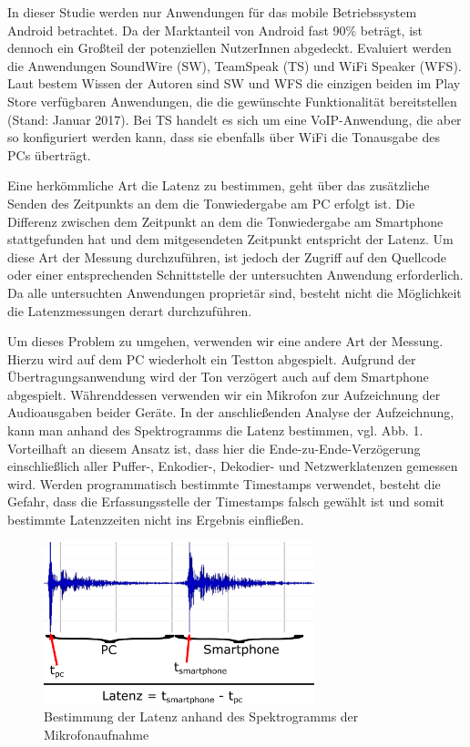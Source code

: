 In dieser Studie werden nur Anwendungen für das mobile Betriebssystem Android betrachtet. Da der Marktanteil von Android fast 90\% beträgt, ist dennoch ein Großteil der potenziellen NutzerInnen abgedeckt. Evaluiert werden die Anwendungen SoundWire (SW), TeamSpeak (TS) und WiFi Speaker (WFS).  Laut bestem Wissen der Autoren sind SW und WFS die einzigen beiden im Play Store verfügbaren Anwendungen, die die gewünschte Funktionalität bereitstellen (Stand: Januar 2017). Bei TS handelt es sich um eine VoIP-Anwendung, die aber so konfiguriert werden kann, dass sie ebenfalls über WiFi die Tonausgabe des PCs überträgt.

Eine herkömmliche Art die Latenz zu bestimmen, geht über das zusätzliche Senden des Zeitpunkts an dem die Tonwiedergabe am PC erfolgt ist. Die Differenz zwischen dem Zeitpunkt an dem die Tonwiedergabe am Smartphone stattgefunden hat und dem mitgesendeten Zeitpunkt entspricht der Latenz. Um diese Art der Messung durchzuführen, ist jedoch der Zugriff auf den Quellcode oder einer entsprechenden Schnittstelle der untersuchten Anwendung erforderlich. Da alle untersuchten Anwendungen proprietär sind, besteht nicht die Möglichkeit die Latenzmessungen derart durchzuführen.

Um dieses Problem zu umgehen, verwenden wir eine andere Art der Messung. Hierzu wird auf dem PC wiederholt ein Testton abgespielt. Aufgrund der Übertragungsanwendung wird der Ton verzögert auch auf dem Smartphone abgespielt. Währenddessen verwenden wir ein Mikrofon zur Aufzeichnung der Audioausgaben beider Geräte. In der anschließenden Analyse der Aufzeichnung, kann man anhand des Spektrogramms die Latenz bestimmen, vgl. Abb. 1. Vorteilhaft an diesem Ansatz ist, dass hier die Ende-zu-Ende-Verzögerung einschließlich aller Puffer-, Enkodier-, Dekodier- und Netzwerklatenzen gemessen wird. Werden programmatisch bestimmte Timestamps verwendet, besteht die Gefahr, dass die Erfassungsstelle der Timestamps falsch gewählt ist und somit bestimmte Latenzzeiten nicht ins Ergebnis einfließen.

\begin{figure}
	\begin{center}
		\includegraphics[width=0.7\textwidth]{img/spektrogramm.png}
		\caption{Bestimmung der Latenz anhand des Spektrogramms der Mikrofonaufnahme}
		\label{fig:spektrogramm}
	\end{center}
\end{figure}

